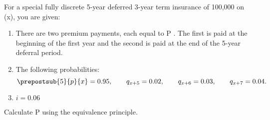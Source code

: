 For a special fully discrete 5-year deferred 3-year term insurance of 100,000 on (x), you are given:
\begin{enumerate}
\item There are two premium payments, each equal to P . The first is paid at the
beginning of the first year and the second is paid at the end of the 5-year
deferral period.
\item The following probabilities:
    \[ \prepostsub{5}{p}{x} = 0.95, 
\quad\quad q_{x+5}=0.02, \quad\quad q_{x+6}=0.03, \quad\quad q_{x+7}=0.04. \]
\item $i=0.06$
\end{enumerate}
Calculate P using the equivalence principle.
